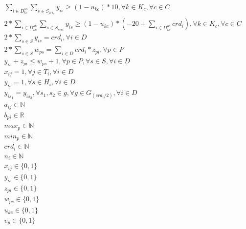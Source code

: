 \begin{eqnarray}
\label{r16}
\sum_{i \in{D_{kc}^{ob}}}^{}{\sum_{s \in{S_{pri_c}}}^{}{y_{is}}} \geq (1 - u_{kc}) * 10, \forall{k}\in{K_c}, \forall{c}\in{C}  &&\\
\label{r17}
2*\sum_{i \in{D_{kc}^{ob}}}^{}{\sum_{s \in{S_{sec_c}}}^{}{y_{is}}}\geq (1 - u_{kc}) * (-20+\sum_{i \in{D_{kc}^{ob}}}^{}{crd_i}),\forall{k}\in{K_c}, \forall{c}\in{C}&&\\
\label{r18}
2*\sum_{s \in S}^{}{y_{is}} = crd_i, \forall{i}\in{D}  &&\\
\label{r19}
2 * \sum_{s \in S}^{}{w_{ps}} = \sum_{i \in D}^{}{crd_i * z_{pi}}, \forall{p}\in{P} &&\\
\label{r20}
y_{is} + z_{pi} \le w_{ps} + 1, \forall{p}\in{P}, \forall{s}\in{S}, \forall{i}\in{D} &&\\
\label{r21}
x_{ij} = 1, \forall{j\in{T_i}},\forall{i \in{D}} &&\\
\label{r22}
y_{is} = 1, \forall{s \in{H_i}}, \forall{i \in{D}} &&\\
\label{r23}
y_{is_1} = y_{is_2}, \forall{s_1, s_2\in{g}}, \forall{g\in{G_{(crd_i/2)}}}, \forall{i\in{D}} &&\\
\label{r24}
a_{ij}\in{\mathbb{N}} &&\\
\label{r25}
b_{pi} \in{\mathbb{R}} &&\\
\label{r26}
max_{p} \in{\mathbb{N}} &&\\
\label{r27}
min_{p} \in{\mathbb{N}} &&\\
\label{r28}
crd_{i} \in{\mathbb{N}} &&\\
\label{r29}
n_{i} \in{\mathbb{N}} &&\\
\label{r30}
x_{ij}\in{\{0,1\}} &&\\
\label{r31}
y_{is}\in{\{0,1\}} &&\\
\label{r32}
z_{pi}\in{\{0,1\}} &&\\
\label{r33}
w_{ps}\in{\{0,1\}} && \\
\label{r34}
u_{kc}\in{\{0,1\}} && \\
\label{r35}
v_{p}\in{\{0,1\}} &&
\end{eqnarray}